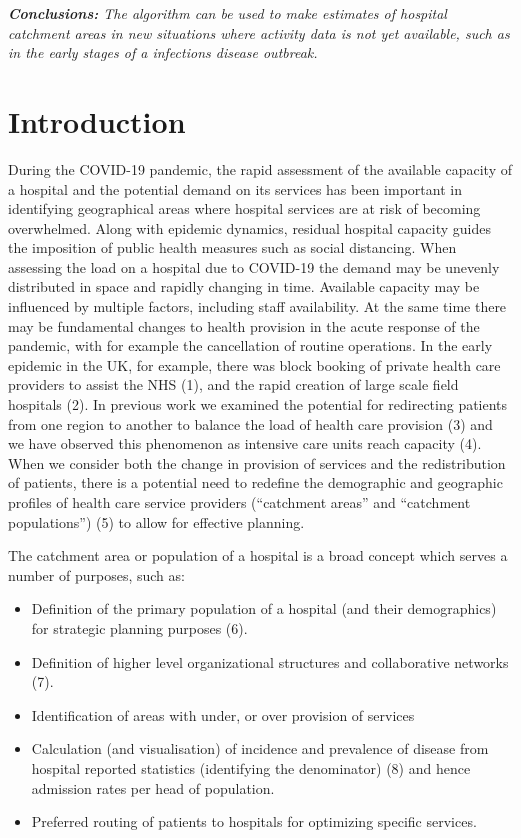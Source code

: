 \documentclass[
]{article}
\providecommand{\tightlist}{%
  \setlength{\itemsep}{0pt}\setlength{\parskip}{0pt}}
\begin{document}
\emph{\textbf{Conclusions:} The algorithm can be used to make estimates
of hospital catchment areas in new situations where activity data is not
yet available, such as in the early stages of a infections disease
outbreak.}

\hypertarget{introduction}{%
\section{Introduction}\label{introduction}}

During the COVID-19 pandemic, the rapid assessment of the available
capacity of a hospital and the potential demand on its services has been
important in identifying geographical areas where hospital services are
at risk of becoming overwhelmed. Along with epidemic dynamics, residual
hospital capacity guides the imposition of public health measures such
as social distancing. When assessing the load on a hospital due to
COVID-19 the demand may be unevenly distributed in space and rapidly
changing in time. Available capacity may be influenced by multiple
factors, including staff availability. At the same time there may be
fundamental changes to health provision in the acute response of the
pandemic, with for example the cancellation of routine operations. In
the early epidemic in the UK, for example, there was block booking of
private health care providers to assist the NHS (1), and the rapid
creation of large scale field hospitals (2). In previous work we
examined the potential for redirecting patients from one region to
another to balance the load of health care provision (3) and we have
observed this phenomenon as intensive care units reach capacity (4).
When we consider both the change in provision of services and the
redistribution of patients, there is a potential need to redefine the
demographic and geographic profiles of health care service providers
(``catchment areas'' and ``catchment populations'') (5) to allow for
effective planning.

The catchment area or population of a hospital is a broad concept which
serves a number of purposes, such as:

\begin{itemize}
\tightlist
\item
  Definition of the primary population of a hospital (and their
  demographics) for strategic planning purposes (6).
\item
  Definition of higher level organizational structures and collaborative
  networks (7).
\item
  Identification of areas with under, or over provision of services
\item
  Calculation (and visualisation) of incidence and prevalence of disease
  from hospital reported statistics (identifying the denominator) (8)
  and hence admission rates per head of population.
\item
  Preferred routing of patients to hospitals for optimizing specific
  services.
\end{itemize}
\end{document}
